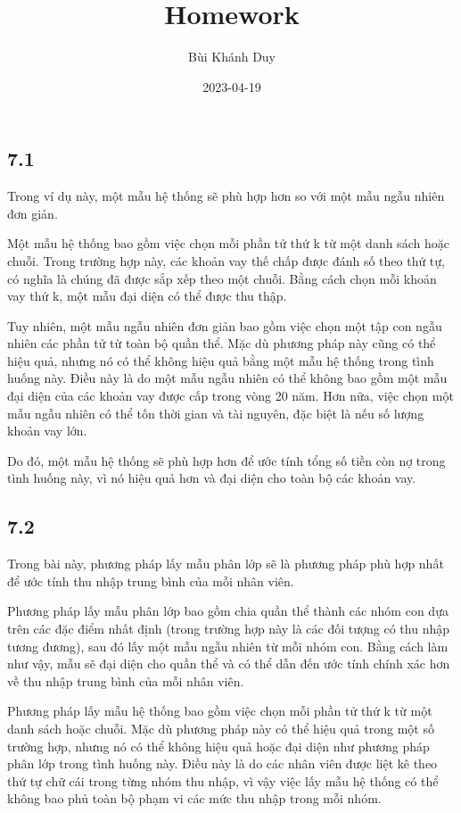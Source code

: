 \documentclass[
]{article}
\title{Homework}
\author{Bùi Khánh Duy}
\date{2023-04-19}
\begin{document}
\maketitle

\hypertarget{section}{%
\subsection{7.1}\label{section}}

Trong ví dụ này, một mẫu hệ thống sẽ phù hợp hơn so với một mẫu ngẫu
nhiên đơn giản.

Một mẫu hệ thống bao gồm việc chọn mỗi phần tử thứ k từ một danh sách
hoặc chuỗi. Trong trường hợp này, các khoản vay thế chấp được đánh số
theo thứ tự, có nghĩa là chúng đã được sắp xếp theo một chuỗi. Bằng cách
chọn mỗi khoản vay thứ k, một mẫu đại diện có thể được thu thập.

Tuy nhiên, một mẫu ngẫu nhiên đơn giản bao gồm việc chọn một tập con
ngẫu nhiên các phần tử từ toàn bộ quần thể. Mặc dù phương pháp này cũng
có thể hiệu quả, nhưng nó có thể không hiệu quả bằng một mẫu hệ thống
trong tình huống này. Điều này là do một mẫu ngẫu nhiên có thể không bao
gồm một mẫu đại diện của các khoản vay được cấp trong vòng 20 năm. Hơn
nữa, việc chọn một mẫu ngẫu nhiên có thể tốn thời gian và tài nguyên,
đặc biệt là nếu số lượng khoản vay lớn.

Do đó, một mẫu hệ thống sẽ phù hợp hơn để ước tính tổng số tiền còn nợ
trong tình huống này, vì nó hiệu quả hơn và đại diện cho toàn bộ các
khoản vay.

\hypertarget{section-1}{%
\subsection{7.2}\label{section-1}}

Trong bài này, phương pháp lấy mẫu phân lớp sẽ là phương pháp phù hợp
nhất để ước tính thu nhập trung bình của mỗi nhân viên.

Phương pháp lấy mẫu phân lớp bao gồm chia quần thể thành các nhóm con
dựa trên các đặc điểm nhất định (trong trường hợp này là các đối tượng
có thu nhập tương đương), sau đó lấy một mẫu ngẫu nhiên từ mỗi nhóm con.
Bằng cách làm như vậy, mẫu sẽ đại diện cho quần thể và có thể dẫn đến
ước tính chính xác hơn về thu nhập trung bình của mỗi nhân viên.

Phương pháp lấy mẫu hệ thống bao gồm việc chọn mỗi phần tử thứ k từ một
danh sách hoặc chuỗi. Mặc dù phương pháp này có thể hiệu quả trong một
số trường hợp, nhưng nó có thể không hiệu quả hoặc đại diện như phương
pháp phân lớp trong tình huống này. Điều này là do các nhân viên được
liệt kê theo thứ tự chữ cái trong từng nhóm thu nhập, vì vậy việc lấy
mẫu hệ thống có thể không bao phủ toàn bộ phạm vi các mức thu nhập trong
mỗi nhóm.
\end{document}
